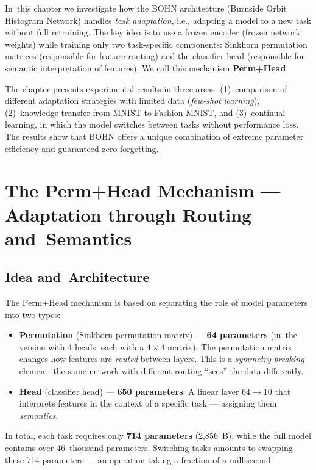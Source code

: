 \documentclass[11pt,a4paper]{report}
\begin{document}
In~this chapter we investigate how the BOHN architecture (Burnside Orbit Histogram Network) handles \emph{task adaptation}, i.e., adapting a model to a new task without full retraining. The key idea is to use a frozen encoder (frozen network weights) while training only two task-specific components: Sinkhorn permutation matrices (responsible for feature routing) and the classifier head (responsible for semantic interpretation of features). We call this mechanism \textbf{Perm+Head}.

The chapter presents experimental results in three areas: (1)~comparison of different adaptation strategies with limited data (\emph{few-shot learning}), (2)~knowledge transfer from MNIST to Fashion-MNIST, and (3)~continual learning, in which the model switches between tasks without performance loss. The results show that BOHN offers a unique combination of extreme parameter efficiency and guaranteed zero forgetting.


\section{The Perm+Head Mechanism --- Adaptation through Routing and~Semantics}
\label{sec:perm_head}


\subsection{Idea and~Architecture}

The Perm+Head mechanism is based on separating the role of model parameters into two types:

\begin{itemize}
    \item \textbf{Permutation} (Sinkhorn permutation matrix) --- \textbf{64 parameters} (in~the version with 4 heads, each with a $4 \times 4$ matrix). The permutation matrix changes how features are \emph{routed} between layers. This is a \emph{symmetry-breaking} element: the same network with different routing ``sees'' the data differently.
    \item \textbf{Head} (classifier head) --- \textbf{650 parameters}. A linear layer $64 \to 10$ that interprets features in the context of a specific task --- assigning them \emph{semantics}.
\end{itemize}

In total, each task requires only \textbf{714 parameters} (2{,}856~B), while the full model contains over 46~thousand parameters. Switching tasks amounts to swapping these 714 parameters --- an operation taking a fraction of a millisecond.
\end{document}
